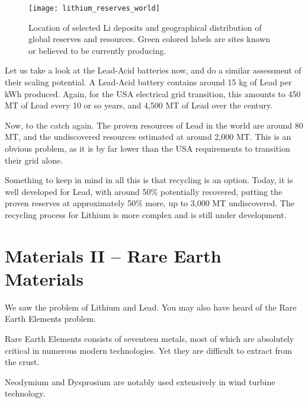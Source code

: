 \begin{figure*}[h]
	\texttt{[image: lithium\_reserves\_world]}
	\caption[Location of selected Li deposits and geographical distribution of global reserves and resources. Green colored labels are sites
known or believed to be currently producing.]{Location of selected Li deposits and geographical distribution of global reserves and resources. Green colored labels are sites
known or believed to be currently producing.}
\end{figure*}

Let us take a look at the Lead-Acid batteries now, and do a similar assessment of their scaling potential. A Lead-Acid battery contains around 15 kg of Lead per kWh produced. Again, for the USA electrical grid transition, this amounts to 450 MT of Lead every 10 or so years, and 4,500 MT of Lead over the century.

Now, to the catch again. The proven resources of Lead in the world are around 80 MT, and the undiscovered resources estimated at around 2,000 MT. This is an obvious problem, as it is by far lower than the USA requirements to transition their grid alone.

Something to keep in mind in all this is that recycling is an option. Today, it is well developed for Lead, with around 50\% potentially recovered, putting the proven reserves at approximately 50\% more, up to 3,000 MT undiscovered. The recycling process for Lithium is more complex and is still under development. 

\section{Materials II -- Rare Earth Materials}


We saw the problem of Lithium and Lead. You may also have heard of the Rare Earth Elements problem.

\begin{kaobox}[frametitle=Rare Earth Materials]

Rare Earth Elements consists of seventeen metals, most of which are absolutely critical in numerous modern technologies. Yet they are difficult to extract from the crust.

Neodymium and Dysprosium are notably used extensively in wind turbine technology.

\end{kaobox}

